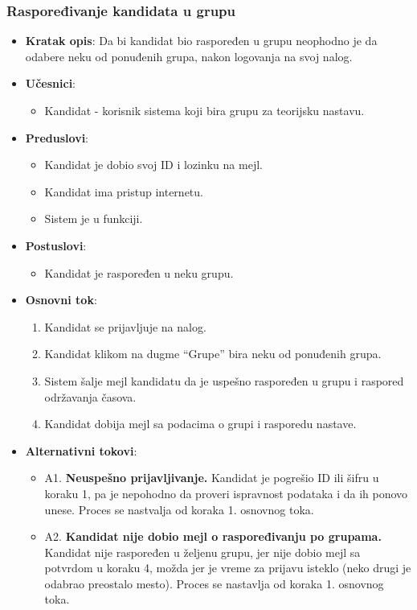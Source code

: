 \subsubsection{Raspoređivanje kandidata u grupu}
\label{subsubsec:grupe}
\begin{itemize}
  \item \textbf{Kratak opis}: Da bi kandidat bio raspoređen u grupu neophodno je da odabere neku od ponuđenih grupa, nakon logovanja na svoj nalog. 
  \item \textbf{Učesnici}: 
    \begin{itemize}
    \item  Kandidat - korisnik sistema koji bira grupu za teorijsku nastavu.
    \end{itemize}
  \item \textbf{Preduslovi}:
    \begin{itemize}
    \item Kandidat je dobio svoj ID i lozinku na mejl.
    \item Kandidat ima pristup internetu.
    \item Sistem je u funkciji.
    \end{itemize}
  \item \textbf{Postuslovi}:
      \begin{itemize}
      \item Kandidat je raspoređen u neku grupu.
      \end{itemize}
  
     
  \item \textbf{Osnovni tok}: 
      \begin{enumerate}
        \item Kandidat se prijavljuje na nalog.
        \item Kandidat klikom na dugme “Grupe” bira neku od ponuđenih grupa.
        \item Sistem šalje mejl kandidatu da je uspešno raspoređen u grupu i raspored održavanja časova.
        \item Kandidat dobija mejl sa podacima o grupi i rasporedu nastave.
      \end{enumerate}

  \item \textbf{Alternativni tokovi}:
      \begin{itemize}
        \item A1. \textbf{Neuspešno prijavljivanje.}
        Kandidat je pogrešio ID ili šifru u koraku 1, pa je nepohodno da proveri ispravnost podataka i da ih ponovo unese. Proces se nastvalja od koraka 1. osnovnog toka.
        \item A2. \textbf{Kandidat nije dobio mejl o raspoređivanju po grupama.}
        Kandidat nije raspoređen u željenu grupu, jer nije dobio mejl sa potvrdom u koraku 4, možda jer je vreme za prijavu isteklo (neko drugi je odabrao preostalo mesto). Proces se nastavlja od koraka 1. osnovnog toka.
      \end{itemize}



\end{itemize}
